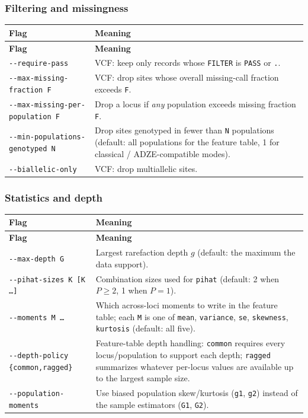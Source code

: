 \documentclass[11pt]{article}
\begin{document}
\subsubsection*{Filtering and missingness}
\begin{longtable}{@{}>{\raggedright\arraybackslash}p{}>{\raggedright\arraybackslash}p{}@{}}
\toprule
\textbf{Flag} & \textbf{Meaning} \\
\midrule
\endfirsthead
\toprule
\textbf{Flag} & \textbf{Meaning} \\
\midrule
\endhead
\texttt{-{}-require-pass} & VCF: keep only records whose \texttt{FILTER} is \texttt{PASS} or \texttt{.}. \\
\texttt{-{}-max-missing-fraction F} & VCF: drop sites whose overall missing-call fraction exceeds \texttt{F}. \\
\texttt{-{}-max-missing-per-population F} & Drop a locus if \emph{any} population exceeds missing fraction \texttt{F}. \\
\texttt{-{}-min-populations-genotyped N} & Drop sites genotyped in fewer than \texttt{N} populations (default: all populations for the feature table, 1 for classical / ADZE-compatible modes). \\
\texttt{-{}-biallelic-only} & VCF: drop multiallelic sites. \\
\bottomrule
\end{longtable}

\subsubsection*{Statistics and depth}
\begin{longtable}{@{}>{\raggedright\arraybackslash}p{}>{\raggedright\arraybackslash}p{}@{}}
\toprule
\textbf{Flag} & \textbf{Meaning} \\
\midrule
\endfirsthead
\toprule
\textbf{Flag} & \textbf{Meaning} \\
\midrule
\endhead
\texttt{-{}-max-depth G} & Largest rarefaction depth \(g\) (default: the maximum the data support). \\
\texttt{-{}-pihat-sizes K [K \ldots]} & Combination sizes used for \texttt{pihat} (default: 2 when \(P \ge 2\), 1 when \(P = 1\)). \\
\texttt{-{}-moments M \ldots} & Which across-loci moments to write in the feature table; each \texttt{M} is one of \texttt{mean}, \texttt{variance}, \texttt{se}, \texttt{skewness}, \texttt{kurtosis} (default: all five). \\
\texttt{-{}-depth-policy \{common,ragged\}} & Feature-table depth handling: \texttt{common} requires every locus/population to support each depth; \texttt{ragged} summarizes whatever per-locus values are available up to the largest sample size. \\
\texttt{-{}-population-moments} & Use biased population skew/kurtosis (\texttt{g1}, \texttt{g2}) instead of the sample estimators (\texttt{G1}, \texttt{G2}). \\
\bottomrule
\end{longtable}
\end{document}
